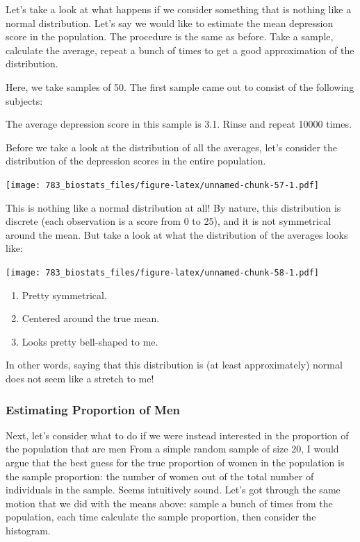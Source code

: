 \documentclass[]{book}
\providecommand{\tightlist}{%
  \setlength{\itemsep}{0pt}\setlength{\parskip}{0pt}}
\theoremstyle{definition}
\theoremstyle{definition}
\theoremstyle{definition}
\theoremstyle{remark}
\begin{document}
Let's take a look at what happens if we consider something that is nothing like a normal distribution. Let's say we would like to estimate the mean depression score in the population. The procedure is the same as before. Take a sample, calculate the average, repeat a bunch of times to get a good approximation of the distribution.

Here, we take samples of 50. The first sample came out to consist of the following subjects:

\hypertarget{htmlwidget-d7c813a12909b2ec0869}{}

The average depression score in this sample is 3.1. Rinse and repeat 10000 times.

Before we take a look at the distribution of all the averages, let's consider the distribution of the depression scores in the entire population.

\texttt{[image: 783\_biostats\_files/figure-latex/unnamed-chunk-57-1.pdf]}

This is nothing like a normal distribution at all! By nature, this distribution is discrete (each observation is a score from 0 to 25), and it is not symmetrical around the mean. But take a look at what the distribution of the averages looks like:

\texttt{[image: 783\_biostats\_files/figure-latex/unnamed-chunk-58-1.pdf]}

\begin{enumerate}
\def\labelenumi{\arabic{enumi}.}
\tightlist
\item
  Pretty symmetrical.
\item
  Centered around the true mean.
\item
  Looks pretty bell-shaped to me.
\end{enumerate}

In other words, saying that this distribution is (at least approximately) normal does not seem like a stretch to me!

\hypertarget{estimating-proportion-of-men}{%
\subsubsection*{Estimating Proportion of Men}\label{estimating-proportion-of-men}}

Next, let's consider what to do if we were instead interested in the proportion of the population that are men From a simple random sample of size 20, I would argue that the best guess for the true proportion of women in the population is the sample proportion: the number of women out of the total number of individuals in the sample. Seems intuitively sound. Let's got through the same motion that we did with the means above: sample a bunch of times from the population, each time calculate the sample proportion, then consider the histogram.
\end{document}
